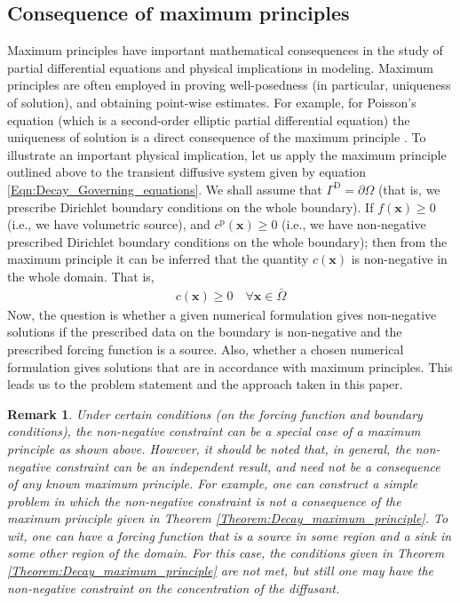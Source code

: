 \documentclass[11pt]{amsart}
\newtheorem{remark}[theorem]{Remark}
\begin{document}
\subsection{Consequence of maximum principles}
Maximum principles have important mathematical consequences in the study of partial differential 
equations and physical implications in modeling. Maximum principles are often employed in proving 
well-posedness (in particular, uniqueness of solution), and obtaining point-wise estimates. For 
example, for Poisson's equation (which is a second-order elliptic partial differential equation) 
the uniqueness of solution is a direct consequence of the maximum principle \cite{McOwen}. 
To illustrate an important physical implication, let us apply the maximum principle outlined above 
to the transient diffusive system given by equation \eqref{Eqn:Decay_Governing_equations}. We shall 
assume that $\Gamma^{\mathrm{D}} = \partial \Omega$ (that is, we prescribe Dirichlet boundary conditions 
on the whole boundary). If $f(\mathbf{x}) \geq 0$ (i.e., we have volumetric source), and $c^{\mathrm{p}}
(\mathbf{x}) \geq 0$ (i.e., we have non-negative prescribed Dirichlet boundary conditions on the whole 
boundary); then from the maximum principle it can be inferred that the quantity $c(\mathbf{x})$ is 
non-negative in the whole domain. That is, 
\begin{align}
  c(\mathbf{x}) \geq 0 \quad \forall \mathbf{x} \in \bar{\Omega}
\end{align}
Now, the question is whether a given numerical formulation gives non-negative solutions if 
the prescribed data on the boundary is non-negative and the prescribed forcing function is 
a source. Also, whether a chosen numerical formulation gives solutions that are in accordance 
with maximum principles. This leads us to the problem statement and the approach taken in this paper. 

\begin{remark}
  Under certain conditions (on the forcing function and boundary conditions), the non-negative 
  constraint can be a special case of a maximum principle as shown above. However, it should 
  be noted that, in general, the non-negative constraint can be an independent result, and need 
  not be a consequence of any known maximum principle. For example, one can construct a 
  simple problem in which the non-negative constraint is not a consequence of the maximum 
  principle given in Theorem \ref{Theorem:Decay_maximum_principle}. To wit, one can have 
  a forcing function that is a source in some region and a sink in some other region of 
  the domain. For this case, the conditions given in Theorem \ref{Theorem:Decay_maximum_principle} 
  are not met, but still one may have the non-negative constraint on the concentration of the 
  diffusant. 
\end{remark}
\end{document}
